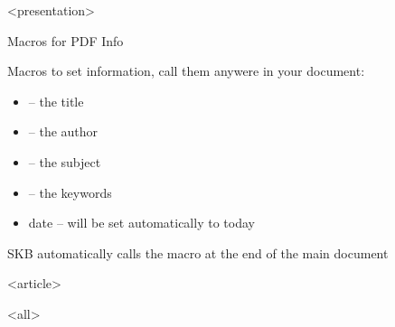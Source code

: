\mode
<presentation>

\begin{frame}{Macros for PDF Info}
  \label{manual:pdfinfo}

  Macros to set information, call them anywere in your document:
  \begin{itemize}
    \item \cmd{\skbtitle} -- the title
    \item \cmd{\skbauthor} -- the author
    \item \cmd{\skbsubject} -- the subject
    \item \cmd{\skbkeywords} -- the keywords
    \item date -- will be set automatically to today
  \end{itemize}

  SKB automatically calls the \cmd{\skbpdfinfo} macro at the end of the main document

\end{frame}


\mode
<article>

\bigskip


\clearpage

\mode
<all>
